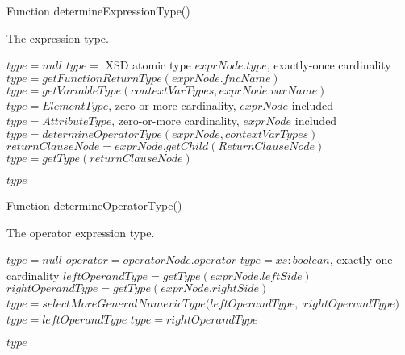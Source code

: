 \begin{algorithm}
\caption{Function determineExpressionType()}
\label{ALG_func_determineExpressionType}
\begin{algorithmic}[1]
\ENSURE The expression type.

\STATE $type = null$
     \STATE $type =$ XSD atomic type $exprNode.type$, exactly-once cardinality
     \STATE $type = getFunctionReturnType(exprNode.fncName)$
     \STATE $type = getVariableType(contextVarTypes, exprNode.varName)$
         \STATE $type = ElementType$, zero-or-more cardinality, $exprNode$ included
         \STATE $type = AttributeType$, zero-or-more cardinality, $exprNode$ included
     \ENDIF
{}
     \STATE $type = determineOperatorType(exprNode, contextVarTypes)$
     \STATE $returnClauseNode = exprNode.getChild(ReturnClauseNode)$
     \STATE $type = getType(returnClauseNode)$
\ENDIF

\RETURN $type$
\end{algorithmic}
\end{algorithm}

\begin{algorithm}
\caption{Function determineOperatorType()}
\label{ALG_func_determineOperatorType}
\begin{algorithmic}[1]
\ENSURE The operator expression type.

\STATE $type = null$
\STATE $operator = operatorNode.operator$
    \STATE $type = xs:boolean$, exactly-one cardinality
    \STATE $leftOperandType = getType(exprNode.leftSide)$
    \STATE $rightOperandType = getType(exprNode.rightSide)$
        \STATE $type = selectMoreGeneralNumericType(leftOperandType,$ $rightOperandType)$
        \STATE $type = leftOperandType$
        \STATE $type = rightOperandType$
    \ENDIF
\ENDIF

\RETURN $type$
\end{algorithmic}
\end{algorithm}

